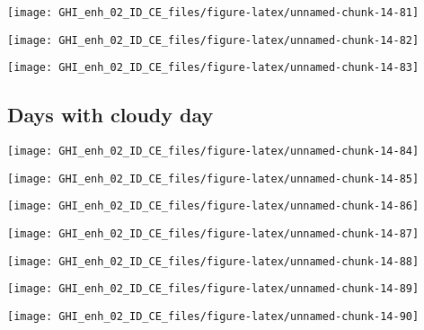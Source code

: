 \documentclass[
  10pt,
  a4paper,oneside]{article}
\begin{document}
\begin{center}\texttt{[image: GHI\_enh\_02\_ID\_CE\_files/figure-latex/unnamed-chunk-14-81]} \end{center}

\begin{center}\texttt{[image: GHI\_enh\_02\_ID\_CE\_files/figure-latex/unnamed-chunk-14-82]} \end{center}

\begin{center}\texttt{[image: GHI\_enh\_02\_ID\_CE\_files/figure-latex/unnamed-chunk-14-83]} \end{center}

\FloatBarrier

\hypertarget{days-with-cloudy-day}{%
\subsection{Days with cloudy day}\label{days-with-cloudy-day}}

\begin{center}\texttt{[image: GHI\_enh\_02\_ID\_CE\_files/figure-latex/unnamed-chunk-14-84]} \end{center}

\begin{center}\texttt{[image: GHI\_enh\_02\_ID\_CE\_files/figure-latex/unnamed-chunk-14-85]} \end{center}

\begin{center}\texttt{[image: GHI\_enh\_02\_ID\_CE\_files/figure-latex/unnamed-chunk-14-86]} \end{center}

\begin{center}\texttt{[image: GHI\_enh\_02\_ID\_CE\_files/figure-latex/unnamed-chunk-14-87]} \end{center}

\begin{center}\texttt{[image: GHI\_enh\_02\_ID\_CE\_files/figure-latex/unnamed-chunk-14-88]} \end{center}

\begin{center}\texttt{[image: GHI\_enh\_02\_ID\_CE\_files/figure-latex/unnamed-chunk-14-89]} \end{center}

\begin{center}\texttt{[image: GHI\_enh\_02\_ID\_CE\_files/figure-latex/unnamed-chunk-14-90]} \end{center}
\end{document}
